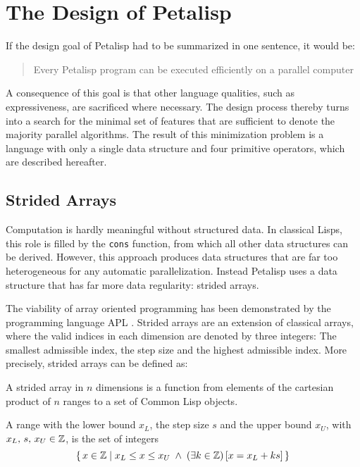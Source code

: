 \section{The Design of Petalisp}
\label{sec:design}

If the design goal of Petalisp had to be summarized in one sentence, it
would be:

\begin{quotation}
  Every Petalisp program can be executed efficiently on a parallel
  computer
\end{quotation}

\noindent A consequence of this goal is that other language qualities, such
as expressiveness, are sacrificed where necessary. The design process
thereby turns into a search for the minimal set of features that are
sufficient to denote the majority parallel algorithms. The result of this
minimization problem is a language with only a single data structure and
four primitive operators, which are described hereafter.

\subsection{Strided Arrays}
\label{sec:strided-arrays}

Computation is hardly meaningful without structured data. In classical
Lisps, this role is filled by the \texttt{cons} function, from which all
other data structures can be derived. However, this approach produces data
structures that are far too heterogeneous for any automatic
parallelization. Instead Petalisp uses a data structure that has far more
data regularity: strided arrays.

The viability of array oriented programming has been demonstrated by the
programming language APL \cite{APL}. Strided arrays are an extension of
classical arrays, where the valid indices in each dimension are denoted by
three integers: The smallest admissible index, the step size and the
highest admissible index. More precisely, strided arrays can be defined as:

\begin{define}
  A strided array in $n$ dimensions is a function from elements of the
  cartesian product of $n$ ranges to a set of Common Lisp objects.
\end{define}

\begin{define}[range]
  A range with the lower bound $x_L$, the step size $s$ and the upper bound
  $x_U$, with $x_L,\, s,\, x_U \in \mathbb{Z}$, is the set of integers
  $$\{\, x \in \mathbb{Z} \;|\; x_{L} \le x \le x_{U} \;\wedge\; (\exists k \in \mathbb{Z})\,[ x = x_{L} + k s]\,\}$$
\end{define}


